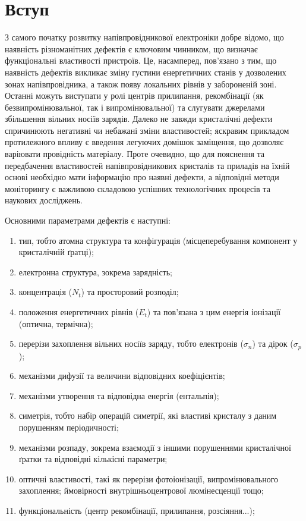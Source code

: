 \chapter*{Вступ}\label{chap0}

З самого початку розвитку напівпровідникової електроніки добре відомо, що наявність
різноманітних дефектів є ключовим чинником, що визначає функціональні властивості пристроїв.
Це, насамперед, пов'язано з тим, що наявність дефектів викликає зміну густини енергетичних станів
у дозволених зонах напівпровідника, а також
появу локальних рівнів у забороненій зоні.
Останні можуть виступати у ролі центрів прилипання, рекомбінації (як безвипромінювальної, так і випромінювальної) та
слугувати джерелами збільшення вільних носіїв зарядів.
Далеко не завжди кристалічні дефекти спричинюють негативні чи небажані зміни властивостей;
яскравим прикладом протилежного впливу є введення легуючих домішок заміщення, що дозволяє варіювати
провідність матеріалу.
Проте очевидно, що для пояснення та передбачення властивостей напівпровідникових кристалів та приладів
на їхній основі необхідно мати інформацію про наявні дефекти, а відповідні методи
моніторингу є важливою складовою успішних технологічних процесів та наукових досліджень.

Основними параметрами дефектів є наступні:
\begin{enumerate}[label=\arabic*),leftmargin=0em,itemindent=1.5em]
\item тип, тобто атомна структура та конфігурація (місцеперебування компонент у кристалічній ґратці);
\item електронна структура, зокрема зарядність;
\item концентрація ($N_t$) та просторовий розподіл;
\item положення енергетичних рівнів ($E_t$) та пов'язана з цим енергія іонізації (оптична, термічна);
\item перерізи захоплення вільних носіїв заряду, тобто електронів ($\sigma_n$) та дірок ($\sigma_p$);
\item механізми дифузії та величини відповідних коефіцієнтів;
\item механізми утворення та відповідна енергія (ентальпія);
\item симетрія, тобто набір операцій симетрії, які властиві кристалу з даним порушенням періодичності;
\item механізми розпаду, зокрема взаємодії з іншими порушеннями кристалічної ґратки та відповідні кількісні параметри;
\item оптичні властивості, такі як перерізи фотоіонізації, випромінювального захоплення;
ймовірності внутрішньоцентрової люмінесценції тощо;
\item функціональність (центр рекомбінації, прилипання, розсіяння...);
\end{enumerate}

